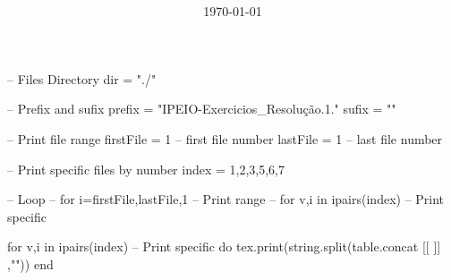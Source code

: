 \documentclass[
    class=article,
    multi={minipage},
    border={3mm},
]{standalone}
\title{\huge\bfseries\color{Emph}\mytitle}
\author{\Large\myauthor}
\date{\Large\today}
\begin{document}
\mymaketitle


\begin{luacode*}

    -- Files Directory
    dir = "./"


    -- Prefix and sufix
    prefix = "IPEIO-Exercicios_Resolução.1."
    sufix  = ""

    
    -- Print file range
    firstFile = 1 -- first file number
    lastFile  = 1 -- last  file number

    -- Print specific files by number
    index = {1,2,3,5,6,7}


    -- Loop
    -- for i=firstFile,lastFile,1 -- Print range
    -- for v,i in ipairs(index)   -- Print specific

    for v,i in ipairs(index)   -- Print specific
    do
        tex.print(string.split(table.concat{
        [[
            \newpage
        ]]
        },"\n"))
    end

\end{luacode*}
\end{document}

